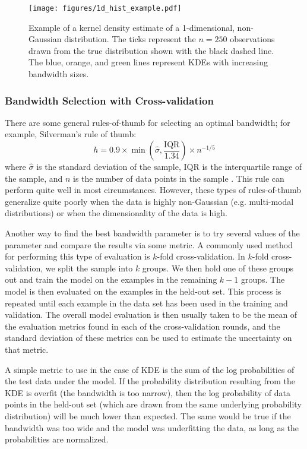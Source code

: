 \begin{figure}
    \centering
    \texttt{[image: figures/1d\_hist\_example.pdf]}
    \caption{Example of a kernel density estimate of a 1-dimensional, non-Gaussian distribution. The ticks represent the $n=250$ observations drawn from the true distribution shown with the black dashed line. The blue, orange, and green lines represent KDEs with increasing bandwidth sizes.}
    \label{fig:1d_hist}
\end{figure}

\subsubsection{Bandwidth Selection with Cross-validation}
There are some general rules-of-thumb for selecting an optimal bandwidth; for example, Silverman's rule of thumb:
$$h= 0.9\times\min\left(\hat{\sigma}, \frac{\textrm{IQR}}{1.34}\right) \times n^{-1/5}$$
where $\hat{\sigma}$ is the standard deviation of the sample, $\textrm{IQR}$ is the interquartile range of the sample, and $n$ is the number of data points in the sample \citep{Silverman1986}. This rule can perform quite well in most circumstances. However, these types of rules-of-thumb generalize quite poorly when the data is highly non-Gaussian (e.g. multi-modal distributions) or when the dimensionality of the data is high.

Another way to find the best bandwidth parameter is to try several values of the parameter and compare the results via some metric. A commonly used method for performing this type of evaluation is $k$-fold cross-validation. In $k$-fold cross-validation, we split the sample into $k$ groups. We then hold one of these groups out and train the model on the examples in the remaining $k-1$ groups. The model is then evaluated on the examples in the held-out set. This process is repeated until each example in the data set has been used in the training and validation. The overall model evaluation is then usually taken to be the mean of the evaluation metrics found in each of the cross-validation rounds, and the standard deviation of these metrics can be used to estimate the uncertainty on that metric.

A simple metric to use in the case of KDE is the sum of the log probabilities of the test data under the model. If the probability distribution resulting from the KDE is overfit (the bandwidth is too narrow), then the log probability of data points in the held-out set (which are drawn from the same underlying probability distribution) will be much lower than expected. The same would be true if the bandwidth was too wide and the model was underfitting the data, as long as the probabilities are normalized.

